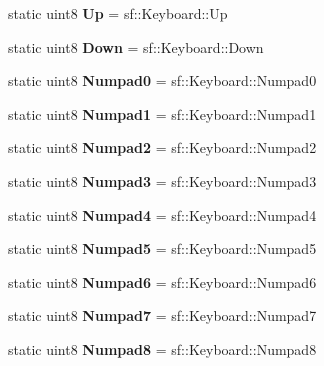 \begin{DoxyCompactItemize}
static uint8 {\bfseries Up} = sf\+::\+Keyboard\+::\+Up
\item 
\mbox{\label{structrvl_1_1_keyboard_a62cbc6bac4bdd22e5bd0f7ff643c5154}} 
static uint8 {\bfseries Down} = sf\+::\+Keyboard\+::\+Down
\item 
\mbox{\label{structrvl_1_1_keyboard_a174cc128b066d3d47b92eb84bfa5f9fd}} 
static uint8 {\bfseries Numpad0} = sf\+::\+Keyboard\+::\+Numpad0
\item 
\mbox{\label{structrvl_1_1_keyboard_ad298a4df3b22d5db48b422683c11eef4}} 
static uint8 {\bfseries Numpad1} = sf\+::\+Keyboard\+::\+Numpad1
\item 
\mbox{\label{structrvl_1_1_keyboard_a3c5db548e542e82abe9da2bff4b3c336}} 
static uint8 {\bfseries Numpad2} = sf\+::\+Keyboard\+::\+Numpad2
\item 
\mbox{\label{structrvl_1_1_keyboard_ae9a006d70737b444a679052f0034ff0b}} 
static uint8 {\bfseries Numpad3} = sf\+::\+Keyboard\+::\+Numpad3
\item 
\mbox{\label{structrvl_1_1_keyboard_ae9a79392079116858064b018d9319010}} 
static uint8 {\bfseries Numpad4} = sf\+::\+Keyboard\+::\+Numpad4
\item 
\mbox{\label{structrvl_1_1_keyboard_a830c41f539641d68ecb880f13f819a5a}} 
static uint8 {\bfseries Numpad5} = sf\+::\+Keyboard\+::\+Numpad5
\item 
\mbox{\label{structrvl_1_1_keyboard_a0bab6aa1de6542b2726294510daa18df}} 
static uint8 {\bfseries Numpad6} = sf\+::\+Keyboard\+::\+Numpad6
\item 
\mbox{\label{structrvl_1_1_keyboard_a36aaed52a580fbc33e694d7fee8bd65f}} 
static uint8 {\bfseries Numpad7} = sf\+::\+Keyboard\+::\+Numpad7
\item 
\mbox{\label{structrvl_1_1_keyboard_a9d18f195564ebbbda3e090666f82df70}} 
static uint8 {\bfseries Numpad8} = sf\+::\+Keyboard\+::\+Numpad8
\item 

\end{DoxyCompactItemize}
